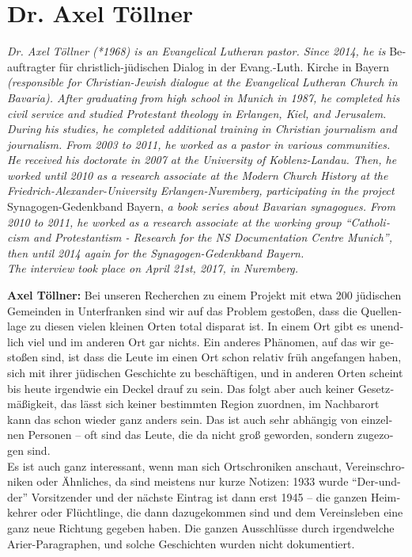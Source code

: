 \section{Dr. Axel Töllner}
\begin{otherlanguage}{ngerman}
\textit{Dr. Axel Töllner (*1968) is an Evangelical Lutheran pastor. Since 2014, he is} Beauftragter für christlich-jüdischen Dialog in der Evang.-Luth. Kirche in Bayern \textit{(responsible for Christian-Jewish dialogue at the Evangelical Lutheran Church in Bavaria). After graduating from high school in Munich in 1987, he completed his civil service and studied Protestant theology in Erlangen, Kiel, and Jerusalem. During his studies, he completed additional training in Christian journalism and journalism. From 2003 to 2011, he worked as a pastor in various communities. He received his doctorate in 2007 at the University of Koblenz-Landau. Then, he worked until 2010 as a research associate at the Modern Church History at the Friedrich-Alexander-University Erlangen-Nuremberg, participating in the project} Synagogen-Gedenkband Bayern, \textit{a book series about Bavarian synagogues. From 2010 to 2011, he worked as a research associate at the working group ``Catholicism and Protestantism - Research for the NS Documentation Centre Munich'', then until 2014 again for the Synagogen-Gedenkband Bayern. \\
The interview took place on April 21st, 2017, in Nuremberg.}\par  
\vspace*{2em}
\textbf{Axel Töllner:} Bei unseren Recherchen zu einem Projekt mit etwa 200 jüdischen Gemeinden in Unterfranken sind wir auf das Problem gestoßen, dass die Quellenlage zu diesen vielen kleinen Orten total disparat ist. In einem Ort gibt es unendlich viel und im anderen Ort gar nichts. Ein anderes Phänomen, auf das wir gestoßen sind, ist dass die Leute im einen Ort schon relativ früh angefangen haben, sich mit ihrer jüdischen Geschichte zu beschäftigen, und in anderen Orten scheint bis heute irgendwie ein Deckel drauf zu sein. Das folgt aber auch keiner Gesetzmäßigkeit, das lässt sich keiner bestimmten Region zuordnen, im Nachbarort kann das schon wieder ganz anders sein. Das ist auch sehr abhängig von einzelnen Personen – oft sind das Leute, die da nicht groß geworden, sondern zugezogen sind.\\
Es ist auch ganz interessant, wenn man sich Ortschroniken anschaut, Vereinschroniken oder Ähnliches, da sind meistens nur kurze Notizen: 1933 wurde "`Der-und-der"' Vorsitzender und der nächste Eintrag ist dann erst 1945 – die ganzen Heimkehrer oder Flüchtlinge, die dann dazugekommen sind und dem Vereinsleben eine ganz neue Richtung gegeben haben. Die ganzen Ausschlüsse durch irgendwelche Arier-Paragraphen, und solche Geschichten wurden nicht dokumentiert.\\ 

\end{otherlanguage}
